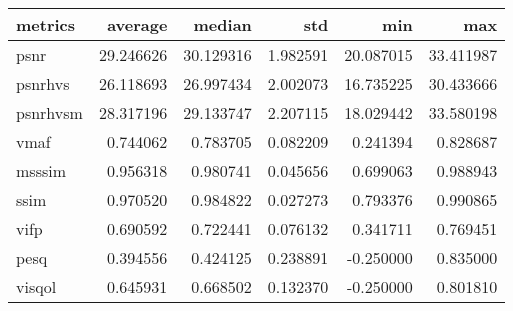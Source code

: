 \begin{tabular}{lrrrrr}
\toprule
metrics & average & median & std & min & max \\
\midrule
psnr & 29.246626 & 30.129316 & 1.982591 & 20.087015 & 33.411987 \\
psnrhvs & 26.118693 & 26.997434 & 2.002073 & 16.735225 & 30.433666 \\
psnrhvsm & 28.317196 & 29.133747 & 2.207115 & 18.029442 & 33.580198 \\
vmaf & 0.744062 & 0.783705 & 0.082209 & 0.241394 & 0.828687 \\
msssim & 0.956318 & 0.980741 & 0.045656 & 0.699063 & 0.988943 \\
ssim & 0.970520 & 0.984822 & 0.027273 & 0.793376 & 0.990865 \\
vifp & 0.690592 & 0.722441 & 0.076132 & 0.341711 & 0.769451 \\
pesq & 0.394556 & 0.424125 & 0.238891 & -0.250000 & 0.835000 \\
visqol & 0.645931 & 0.668502 & 0.132370 & -0.250000 & 0.801810 \\
\bottomrule
\end{tabular}
